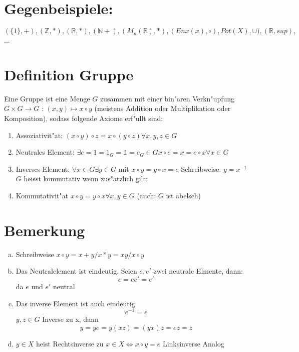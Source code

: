 \documentclass[12pt,a4paper,ngerman]{scrreprt}
\begin{document}
\section{Gegenbeispiele:}

$(\{1\},+),(\mathbb{Z},*),(\mathbb{R},*),(\mathbb{N}+),(M_n(\mathbb{R}),*), (Enx(x), \circ), Pot(X), \cup ), (\mathbb{R}, sup),$ ...

\section{Definition Gruppe}

Eine Gruppe ist eine Menge $G$ zusammen mit einer bin"aren Verkn"upfung 
$G\times G \to G$ : $ (x,y)\mapsto x \circ y$
(meistens Addition oder Multiplikation oder Komposition), sodass folgende Axiome erf"ullt sind:

\begin{enumerate}[({G}1)]
\item Assoziativit"at: $(x\circ y) \circ z = x \circ (y \circ z) \forall x,y,z \in G$
\item Neutrales Element: $\exists e = 1 = 1_G = \mathbb{1} = e_G \in G x \circ e = x = e \circ x \forall x \in G$
\item Inverses Element: $\forall x \in G \exists y \in G$ mit $ x \circ y = y \circ x = e$ Schreibweise: $y = x^{-1}$
\\ $G$ heisst kommutativ wenn zus"atzlich gilt:
\item Kommutativit"at $ x \circ y = y \circ x \forall x,y \in G$ (auch: $G$ ist abelsch)
\end{enumerate}

\section{Bemerkung}
\begin{enumerate}[(a)]
\item Schreibweise $x \circ y = x+y / x*y = xy / x \circ y$
\item Das Neutralelement ist eindeutig. Seien $e,e'$ zwei neutrale Elmente, dann: 
$$ e = ee' = e'$$ da $e$ und $e'$ neutral

\item Das inverse Element ist auch eindeutig
$$e^{-1} = e$$
$y,z \in G$ Inverse zu x, dann $$y=ye = y(xz) = (yx)z = ez = z$$

\item $y \in X$ heist Rechtsinverse zu $x \in X \Leftrightarrow x \circ y = e$ Linksinverse Analog
\end{enumerate}
\end{document}
